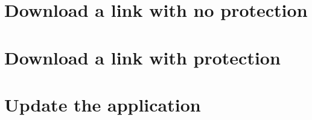 \documentclass[journal]{IEEEtran}
\begin{document}
\section{Download a link with no protection}


\section{Download a link with protection}


\section{Update the application}


\printbibliography

\end{document}
